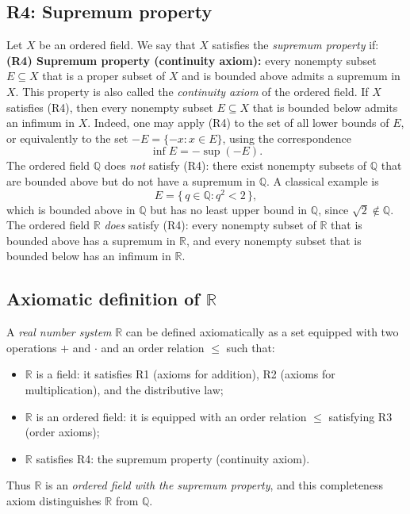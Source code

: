 \documentclass[11pt,a4paper]{article}
\theoremstyle{definition} \newtheorem{definition}{Definition} \theoremstyle{plain} \newtheorem{theorem}{Theorem}
\begin{document}
\subsection{R4: Supremum property}
Let $X$ be an ordered field. We say that $X$ satisfies the \emph{supremum property} if:
\medskip
\textbf{(R4) Supremum property (continuity axiom):} every nonempty subset $E\subseteq X$ that is a proper subset of $X$ and is bounded above admits a supremum in $X$.
\medskip
This property is also called the \emph{continuity axiom} of the ordered field.
\medskip
If $X$ satisfies (R4), then every nonempty subset $E\subseteq X$ that is bounded below admits an infimum in $X$.
Indeed, one may apply (R4) to the set of all lower bounds of $E$, or equivalently to the set $-E=\{-x : x\in E\}$, using the correspondence
\[ \inf E = -\sup(-E). \]
\medskip
The ordered field $\mathbb{Q}$ does \emph{not} satisfy (R4): there exist nonempty subsets of $\mathbb{Q}$ that are bounded above but do not have a supremum in $\mathbb{Q}$.
A classical example is
\[ E = \{\,q\in\mathbb{Q} : q^2 < 2\,\}, \]
which is bounded above in $\mathbb{Q}$ but has no least upper bound in $\mathbb{Q}$, since $\sqrt{2}\notin\mathbb{Q}$.
The ordered field $\mathbb{R}$ \emph{does} satisfy (R4): every nonempty subset of $\mathbb{R}$ that is bounded above has a supremum in $\mathbb{R}$, and every nonempty subset that is bounded below has an infimum in $\mathbb{R}$.
\subsection{Axiomatic definition of \texorpdfstring{$\mathbb{R}$}{R}}
A \emph{real number system} $\mathbb{R}$ can be defined axiomatically as a set equipped with two operations $+$ and $\cdot$ and an order relation $\le$ such that:
\begin{itemize}
\item $\mathbb{R}$ is a field: it satisfies R1 (axioms for addition), R2 (axioms for multiplication), and the distributive law;
\item $\mathbb{R}$ is an ordered field: it is equipped with an order relation $\le$ satisfying R3 (order axioms);
\item $\mathbb{R}$ satisfies R4: the supremum property (continuity axiom). \end{itemize}
Thus $\mathbb{R}$ is an \emph{ordered field with the supremum property}, and this completeness axiom distinguishes $\mathbb{R}$ from $\mathbb{Q}$.
\clearpage
\end{document}
